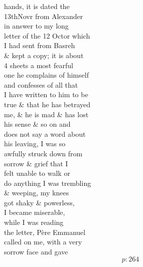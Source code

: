 \documentclass{report}
\begin{document}
	\par{
 	hands, it is dated the\ \\13thNovr from Alexander\ \\in answer to my long\ \\letter of the 12 Octor which\ \\I had sent from Basreh\ \\\& kept a copy; it is about\ \\4 sheets a most fearful\ \\one he complains of himself\ \\and confesses of all that\ \\I have written to him to be\ \\true \& that he has betrayed\ \\me, \& he is mad \& has lost\ \\his sense \& so on and\ \\does not say a word about\ \\his leaving, I was so\ \\awfully struck down from\ \\sorrow \& grief that I\ \\felt unable to walk or\ \\do anything I was trembling\ \\\& weeping, my knees\ \\got shaky \& powerless,\ \\I became miserable,\ \\while I was reading\ \\the letter, Père Emmanuel\ \\called on me, with a very\ \\sorrow face and gave\ \\
  \[p: 264 \]

	}

\end{document}
